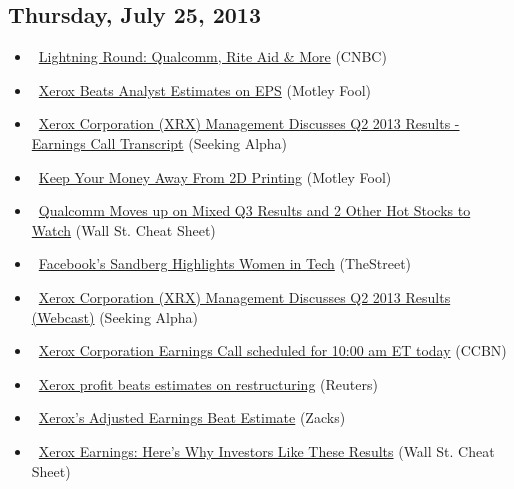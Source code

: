 \documentclass[11pt,asymmetric]{article}
\begin{document}
\subsection*{Thursday, July 25, 2013}
\begin{itemize}
\item\ \href{http://www.cnbc.com/id/100915454?__source=yahoo%7Cfinance%7Cheadline%7Cheadline%7Cstory&par=yahoo&doc=100915454%7CLightning+Round:+Qualcomm}{Lightning Round: Qualcomm, Rite Aid \& More} (CNBC)
\item\ \href{http://www.fool.com/investing/general/2013/07/25/xerox-beats-analyst-estimates-on-eps.aspx?source=eptyholnk303100&logvisit=y&npu=y}{Xerox Beats Analyst Estimates on EPS} (Motley Fool)
\item\ \href{http://seekingalpha.com/article/1572022-xerox-corporation-xrx-management-discusses-q2-2013-results-earnings-call-transcript?source=yahoo}{Xerox Corporation (XRX) Management Discusses Q2 2013 Results - Earnings Call Transcript} (Seeking Alpha)
\item\ \href{http://beta.fool.com/phiwoo/2013/07/25/keep-your-money-away-from-2d-printing/41263/?source=eogyholnk0000001}{Keep Your Money Away From 2D Printing} (Motley Fool)
\item\ \href{http://wallstcheatsheet.com/stocks/qualcomm-moves-up-on-mixed-q3-results-and-2-other-hot-stocks-to-watch.html/?ref=YF}{Qualcomm Moves up on Mixed Q3 Results and 2 Other Hot Stocks to Watch} (Wall St. Cheat Sheet)
\item\ \href{http://www.thestreet.com/story/11989398/1/facebooks-sandberg-highlights-women-in-tech.html?puc=yahoo&cm_ven=YAHOO}{Facebook's Sandberg Highlights Women in Tech} (TheStreet)
\item\ \href{http://seekingalpha.com/article/1570782-xerox-corporation-xrx-management-discusses-q2-2013-results-webcast?source=yahoo}{Xerox Corporation (XRX) Management Discusses Q2 2013 Results (Webcast)} (Seeking Alpha)
\item\ \href{http://biz.yahoo.com/cc/1/139911.html}{Xerox Corporation Earnings Call scheduled for 10:00 am ET today} (CCBN)
\item\ \href{http://finance.yahoo.com/news/xerox-second-quarter-profit-beats-111502277.html}{Xerox profit beats estimates on restructuring} (Reuters)
\item\ \href{http://finance.yahoo.com/news/xeroxs-adjusted-earnings-beat-estimate-133619469.html}{Xerox's Adjusted Earnings Beat Estimate} (Zacks)
\item\ \href{http://wallstcheatsheet.com/stocks/xerox-earnings-heres-why-investors-like-these-results.html/?ref=YF}{Xerox Earnings: Here’s Why Investors Like These Results} (Wall St. Cheat Sheet)

\end{itemize}
\end{document}
